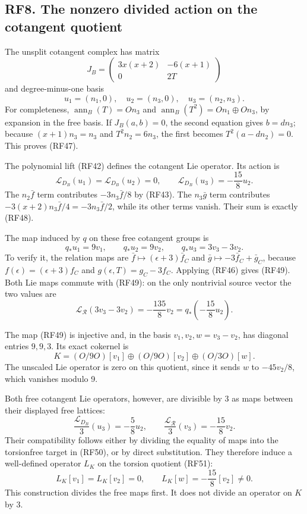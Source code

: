 \documentclass[
]{article}
\begin{document}
\subsection{RF8. The nonzero divided action on the cotangent
quotient}\label{rf8.-the-nonzero-divided-action-on-the-cotangent-quotient}

The unsplit cotangent complex has matrix \[
J_B=
\begin{pmatrix}3x(x+2)&-6(x+1)\\0&2T\end{pmatrix}
\] and degree-minus-one basis \[
u_1=(n_1,0),\quad u_2=(n_3,0),\quad u_3=(n_2,n_3).
\tag{RF47}
\] For completeness, \(\operatorname{ann}_B(T)=On_3\) and
\(\operatorname{ann}_B(T^2)=On_1\oplus On_3\), by expansion in the free
basis. If \(J_B(a,b)=0\), the second equation gives \(b=dn_3\); because
\((x+1)n_3=n_3\) and \(T^2n_2=6n_3\), the first becomes
\(T^2(a-dn_2)=0\). This proves (RF47).

The polynomial lift (RF42) defines the cotangent Lie operator. Its
action is \[
\mathcal L_{D_B}(u_1)=\mathcal L_{D_B}(u_2)=0,\qquad
\mathcal L_{D_B}(u_3)=-\frac{15}{8}u_2.
\tag{RF48}
\] The \(n_2\bar f\) term contributes \(-3n_3\bar f/8\) by (RF43). The
\(n_3\bar g\) term contributes \(-3(x+2)n_3\bar f/4=-3n_3\bar f/2\),
while its other terms vanish. Their sum is exactly (RF48).

The map induced by \(q\) on these free cotangent groups is \[
q_*u_1=9v_1,\qquad q_*u_2=9v_2,\qquad
q_*u_3=3v_3-3v_2.
\tag{RF49}
\] To verify it, the relation maps are
\(\bar f\mapsto(\epsilon+3)\bar f_C\) and
\(\bar g\mapsto-3\bar f_C+\bar g_C\), because
\(f(\epsilon)=(\epsilon+3)f_C\) and \(g(\epsilon,T)=g_C-3f_C\). Applying
(RF46) gives (RF49). Both Lie maps commute with (RF49): on the only
nontrivial source vector the two values are \[
\mathcal L_{\mathcal R}(3v_3-3v_2)
=-\frac{135}{8}v_2
=q_*\!\left(-\frac{15}{8}u_2\right).
\tag{RF50}
\]

The map (RF49) is injective and, in the basis \(v_1,v_2,w=v_3-v_2\), has
diagonal entries \(9,9,3\). Its exact cokernel is \[
K=(O/9O)[v_1]\oplus(O/9O)[v_2]\oplus(O/3O)[w].
\tag{RF51}
\] The unscaled Lie operator is zero on this quotient, since it sends
\(w\) to \(-45v_2/8\), which vanishes modulo 9.

Both free cotangent Lie operators, however, are divisible by 3 as maps
between their displayed free lattices: \[
\frac{\mathcal L_{D_B}}3(u_3)=-\frac58u_2,\qquad
\frac{\mathcal L_{\mathcal R}}3(v_3)=-\frac{15}{8}v_2.
\tag{RF52}
\] Their compatibility follows either by dividing the equality of maps
into the torsionfree target in (RF50), or by direct substitution. They
therefore induce a well-defined operator \(L_K\) on the torsion quotient
(RF51): \[
L_K[v_1]=L_K[v_2]=0,\qquad
L_K[w]=-\frac{15}{8}[v_2]\ne0.
\tag{RF53}
\] This construction divides the free maps first. It does not divide an
operator on \(K\) by 3.
\end{document}

